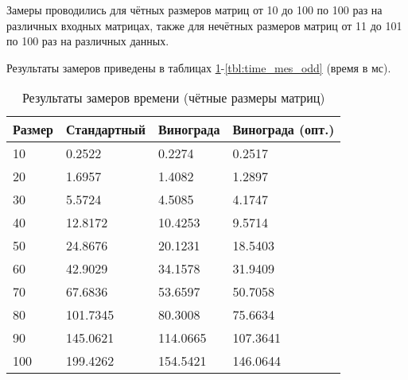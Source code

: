 Замеры проводились для чётных размеров матриц от 10 до 100 по 100 раз на различных входных матрицах,  также  для нечётных размеров матриц от 11 до 101 по 100 раз на различных данных.

Результаты замеров приведены в таблицах \ref{tbl:time_mes_even}-\ref{tbl:time_mes_odd} (время в мс).

\begin{table}[h]
    \begin{center}
        \begin{threeparttable}
        \captionsetup{justification=raggedright,singlelinecheck=off}
        \caption{Результаты замеров времени (чётные размеры матриц)}
        \label{tbl:time_mes_even}
        \begin{tabular}{|l|l|l|l|}
            \hline
            Размер & Стандартный & Винограда & Винограда (опт.) \\
            \hline
            10 & 0.2522 & 0.2274 & 0.2517 \\
            \hline
            20 & 1.6957 & 1.4082 & 1.2897 \\
            \hline
            30 & 5.5724 & 4.5085 & 4.1747 \\
            \hline
            40 & 12.8172 & 10.4253 & 9.5714 \\
            \hline
            50 & 24.8676 & 20.1231 & 18.5403 \\
            \hline
            60 & 42.9029 & 34.1578 & 31.9409 \\
            \hline
            70 & 67.6836 & 53.6597 & 50.7058 \\
            \hline
            80 & 101.7345 & 80.3008 & 75.6634 \\
            \hline
            90 & 145.0621 & 114.0665 & 107.3641 \\
            \hline
            100 & 199.4262 & 154.5421 & 146.0644 \\
            \hline
		\end{tabular}
    \end{threeparttable}
\end{center}
\end{table}

\clearpage


